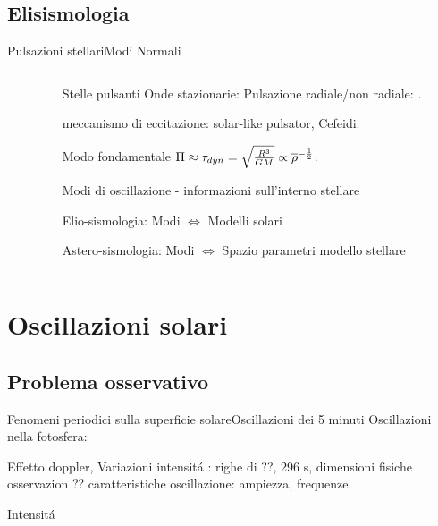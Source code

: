 


\subsection{Elisismologia}

\begin{frame}{Pulsazioni stellari}{Modi Normali}
\begin{columns}

\begin{column}{0.5\textwidth}  %
    \begin{center}
     \end{center}
\end{column}

\begin{column}{0.5\textwidth}
 \begin{block}{Stelle pulsanti}
Onde stazionarie: Pulsazione radiale/non radiale: .

 meccanismo di eccitazione: solar-like pulsator, Cefeidi.

 Modo fondamentale $\Pi\approx\tau_{dyn}=\sqrt{\frac{R^3}{GM}}\propto\overline{\rho}^{-\frac{1}{2}}$.

 Modi di oscillazione - informazioni sull'interno stellare

 Elio-sismologia: Modi $\Leftrightarrow$ Modelli solari

 Astero-sismologia: Modi $\Leftrightarrow$ Spazio parametri modello stellare


\end{block}

\end{column}

\end{columns}
\end{frame}



\section{Oscillazioni solari}

\subsection{Problema osservativo}

\begin{frame}{Fenomeni periodici sulla superficie solare}{Oscillazioni dei 5 minuti}
Oscillazioni nella fotosfera:

Effetto doppler, Variazioni intensit\'a
\pause
\cite{lei62velocity}: righe di ??, 296 s, dimensioni fisiche osservazion ?? 
\pause
caratteristiche oscillazione: ampiezza, frequenze

\pause
Intensit\'a


\end{frame}



